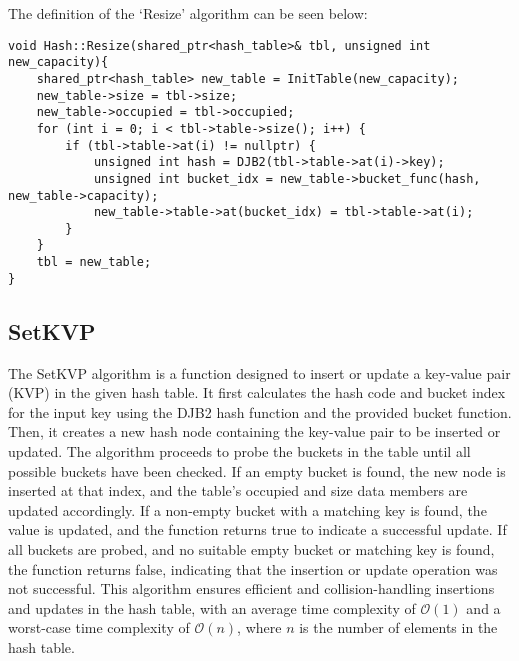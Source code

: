 \begin{highlight}

The definition of the `Resize' algorithm can be seen below:

\horizontalline

\begin{verbatim}
void Hash::Resize(shared_ptr<hash_table>& tbl, unsigned int new_capacity){
    shared_ptr<hash_table> new_table = InitTable(new_capacity);
    new_table->size = tbl->size;
    new_table->occupied = tbl->occupied;
    for (int i = 0; i < tbl->table->size(); i++) {
        if (tbl->table->at(i) != nullptr) {
            unsigned int hash = DJB2(tbl->table->at(i)->key);
            unsigned int bucket_idx = new_table->bucket_func(hash, new_table->capacity);
            new_table->table->at(bucket_idx) = tbl->table->at(i);
        }
    }
    tbl = new_table;
}
\end{verbatim}

\end{highlight}

\subsection*{SetKVP}

The SetKVP algorithm is a function designed to insert or update a key-value pair (KVP) in the given hash table. It first calculates the hash code and bucket index for the input key using the DJB2 hash function 
and the provided bucket function. Then, it creates a new hash node containing the key-value pair to be inserted or updated. The algorithm proceeds to probe the buckets in the table until all possible buckets 
have been checked. If an empty bucket is found, the new node is inserted at that index, and the table's occupied and size data members are updated accordingly. If a non-empty bucket with a matching key is found, 
the value is updated, and the function returns true to indicate a successful update. If all buckets are probed, and no suitable empty bucket or matching key is found, the function returns false, indicating that 
the insertion or update operation was not successful. This algorithm ensures efficient and collision-handling insertions and updates in the hash table, with an average time complexity of $\mathcal{O}(1)$ and a 
worst-case time complexity of $\mathcal{O}(n)$, where $n$ is the number of elements in the hash table.


